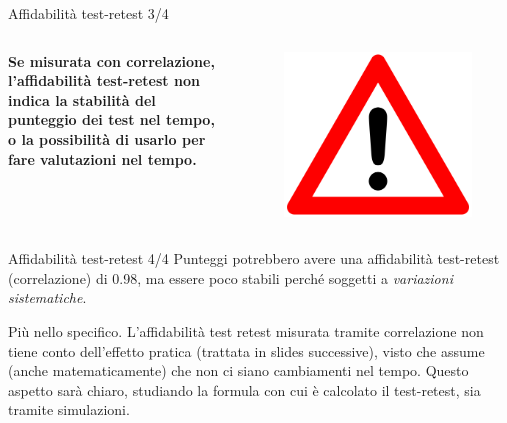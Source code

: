 \documentclass[
  ignorenonframetext,
]{beamer}
\begin{document}
\begin{frame}{Affidabilità test-retest 3/4}
\label{affidabilituxe0-test-retest-34}
\begin{columns}
\small
\textbf{Se misurata con correlazione, l'affidabilità test-retest \textbf{non indica la stabilità del punteggio dei test nel tempo, o la possibilità di usarlo per fare valutazioni nel tempo.}} 

\begin{figure}
\includegraphics[scale=0.05]{Figures/triangle.png}
\end{figure}
\end{columns}
\end{frame}

\begin{frame}{Affidabilità test-retest 4/4}
\label{affidabilituxe0-test-retest-44}
Punteggi potrebbero avere una affidabilità test-retest (correlazione) di
0.98, ma essere poco stabili perché soggetti a \emph{variazioni
sistematiche}.

\pause

Più nello specifico. L'affidabilità test retest misurata tramite
correlazione non tiene conto dell'effetto pratica (trattata in slides
successive), visto che assume (anche matematicamente) che non ci siano
cambiamenti nel tempo. Questo aspetto sarà chiaro, studiando la formula
con cui è calcolato il test-retest, sia tramite simulazioni.
\end{frame}
\end{document}
